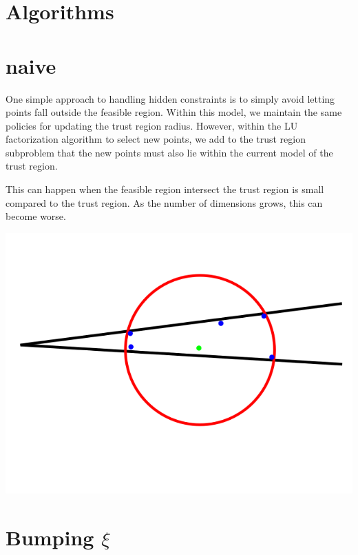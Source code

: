 \documentclass{article}
\begin{document}




\section{Algorithms}


\section{naive}
One simple approach to handling hidden constraints is to simply avoid letting points fall outside the feasible region.
Within this model, we maintain the same policies for updating the trust region radius.
However, within the LU factorization algorithm to select new points, we add to the trust region subproblem that the new points must also lie within the current model of the trust region.

This can happen when the feasible region intersect the trust region is small compared to the trust region.
As the number of dimensions grows, this can become worse.

\includegraphics[scale=0.4]{bad_lambda.png}

\section{Bumping $\xi$}
\end{document}
